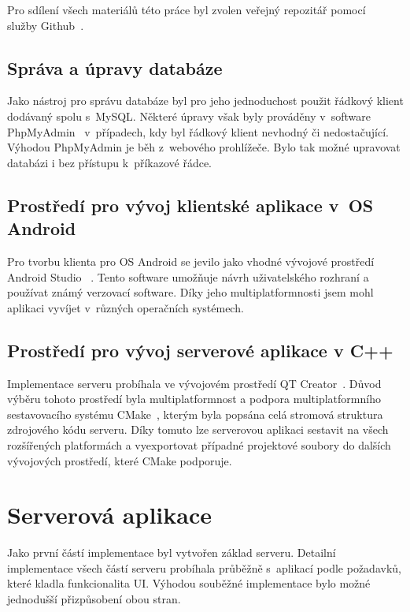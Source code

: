 \documentclass[thesis=B,czech]{FITthesis}[2013/10/20]
\begin{document}
Pro sdílení všech materiálů této práce byl zvolen veřejný repozitář pomocí~\cite{repo} služby Github~\cite{github}.

\subsection{Správa a úpravy databáze}

Jako nástroj pro správu databáze byl pro jeho jednoduchost použit řádkový klient dodávaný spolu s~MySQL. Některé úpravy však byly prováděny v~software PhpMyAdmin~\cite{phpmyadmin} v~případech, kdy byl řádkový klient nevhodný či nedostačující. Výhodou PhpMyAdmin je běh z~webového prohlížeče. Bylo tak možné upravovat databázi i bez přístupu k~příkazové řádce.

\subsection{Prostředí pro vývoj klientské aplikace v~OS Android}

Pro tvorbu klienta pro OS Android se jevilo jako vhodné vývojové prostředí Android Studio ~\cite{android_studio}. Tento software umožňuje návrh uživatelského rozhraní a používat známý verzovací software. Díky jeho multiplatformnosti jsem mohl aplikaci vyvíjet v~různých operačních systémech.

\subsection{Prostředí pro vývoj serverové aplikace v C++}

Implementace serveru probíhala ve vývojovém prostředí QT Creator~\cite{qtcreator}. Důvod výběru tohoto prostředí byla multiplatformnost a podpora multiplatformního sestavovacího systému CMake~\cite{cmake}, kterým byla popsána celá stromová struktura zdrojového kódu serveru. Díky tomuto lze serverovou aplikaci sestavit na všech rozšířených platformách a vyexportovat případné projektové soubory do dalších vývojových prostředí, které CMake podporuje.

\section{Serverová aplikace}

Jako první částí implementace byl vytvořen základ serveru. Detailní implementace všech částí serveru probíhala průběžně s~aplikací podle požadavků, které kladla funkcionalita UI. Výhodou souběžné implementace bylo možné jednodušší přizpůsobení obou stran.
\end{document}
